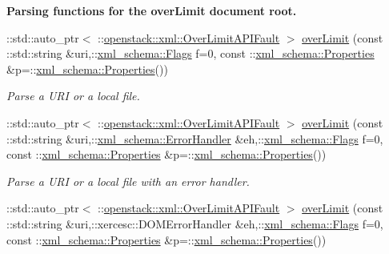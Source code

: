 \begin{Indent}{\bf Parsing functions for the overLimit document root.}\par
\begin{DoxyCompactItemize}
\item 
::std::auto\_\-ptr$<$ ::\hyperlink{classopenstack_1_1xml_1_1OverLimitAPIFault}{openstack::xml::OverLimitAPIFault} $>$ \hyperlink{namespaceopenstack_1_1xml_a4616b86ef6037c164f11290a255636c5}{overLimit} (const ::std::string \&uri,::\hyperlink{namespacexml__schema_affb4c227cbd9aa7453dd1dc5a1401943}{xml\_\-schema::Flags} f=0, const ::\hyperlink{namespacexml__schema_ad27ce19a7ee1d3b1064092648898f64c}{xml\_\-schema::Properties} \&p=::\hyperlink{namespacexml__schema_ad27ce19a7ee1d3b1064092648898f64c}{xml\_\-schema::Properties}())
\begin{DoxyCompactList}\small\item\em Parse a URI or a local file. \item\end{DoxyCompactList}\item 
::std::auto\_\-ptr$<$ ::\hyperlink{classopenstack_1_1xml_1_1OverLimitAPIFault}{openstack::xml::OverLimitAPIFault} $>$ \hyperlink{namespaceopenstack_1_1xml_ab1157f00eafef905d0aec985a63368bc}{overLimit} (const ::std::string \&uri,::\hyperlink{namespacexml__schema_ab1c9361bfd3b404eaabf0c31eded79dc}{xml\_\-schema::ErrorHandler} \&eh,::\hyperlink{namespacexml__schema_affb4c227cbd9aa7453dd1dc5a1401943}{xml\_\-schema::Flags} f=0, const ::\hyperlink{namespacexml__schema_ad27ce19a7ee1d3b1064092648898f64c}{xml\_\-schema::Properties} \&p=::\hyperlink{namespacexml__schema_ad27ce19a7ee1d3b1064092648898f64c}{xml\_\-schema::Properties}())
\begin{DoxyCompactList}\small\item\em Parse a URI or a local file with an error handler. \item\end{DoxyCompactList}\item 
::std::auto\_\-ptr$<$ ::\hyperlink{classopenstack_1_1xml_1_1OverLimitAPIFault}{openstack::xml::OverLimitAPIFault} $>$ \hyperlink{namespaceopenstack_1_1xml_a22e2f7085215f55ecb6d90a975d95704}{overLimit} (const ::std::string \&uri,::xercesc::DOMErrorHandler \&eh,::\hyperlink{namespacexml__schema_affb4c227cbd9aa7453dd1dc5a1401943}{xml\_\-schema::Flags} f=0, const ::\hyperlink{namespacexml__schema_ad27ce19a7ee1d3b1064092648898f64c}{xml\_\-schema::Properties} \&p=::\hyperlink{namespacexml__schema_ad27ce19a7ee1d3b1064092648898f64c}{xml\_\-schema::Properties}())

\end{DoxyCompactItemize}
\end{Indent}
